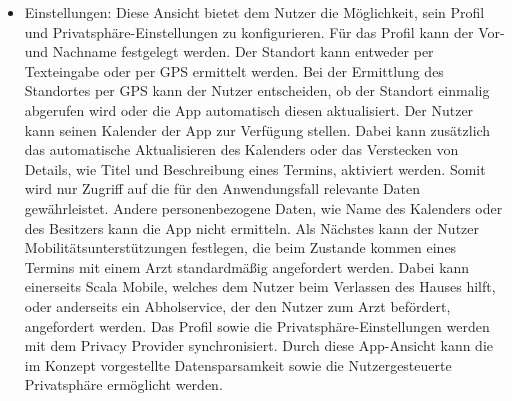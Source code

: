 \begin{itemize}
    \item Einstellungen: Diese Ansicht bietet dem Nutzer die Möglichkeit, sein Profil und Privatsphäre-Einstellungen zu konfigurieren. Für das Profil kann der Vor- und Nachname festgelegt werden. Der Standort kann entweder per Texteingabe oder per GPS ermittelt werden. Bei der Ermittlung des Standortes per GPS kann der Nutzer entscheiden, ob der Standort einmalig abgerufen wird oder die App automatisch diesen aktualisiert. Der Nutzer kann seinen Kalender der App zur Verfügung stellen. Dabei kann zusätzlich das automatische Aktualisieren des Kalenders oder das Verstecken von Details, wie Titel und Beschreibung eines Termins, aktiviert werden. Somit wird nur Zugriff auf die für den Anwendungsfall relevante Daten gewährleistet. Andere personenbezogene Daten, wie Name des Kalenders oder des Besitzers kann die App nicht ermitteln. Als Nächstes kann der Nutzer Mobilitätsunterstützungen festlegen, die beim Zustande kommen eines Termins mit einem Arzt standardmäßig angefordert werden. Dabei kann einerseits Scala Mobile, welches dem Nutzer beim Verlassen des Hauses hilft, oder anderseits ein Abholservice, der den Nutzer zum Arzt befördert, angefordert werden. Das Profil sowie die Privatsphäre-Einstellungen werden mit dem Privacy Provider synchronisiert. Durch diese App-Ansicht kann die im Konzept vorgestellte Datensparsamkeit  sowie die Nutzergesteuerte Privatsphäre ermöglicht werden.
\end{itemize}

